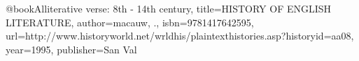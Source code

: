 @book{Alliterative verse: 8th - 14th century,
  title={HISTORY OF ENGLISH LITERATURE},
  author={macauw, .},
  isbn={9781417642595},
  url={http://www.historyworld.net/wrldhis/plaintexthistories.asp?historyid=aa08},
  year={1995},
  publisher={San Val}
}
